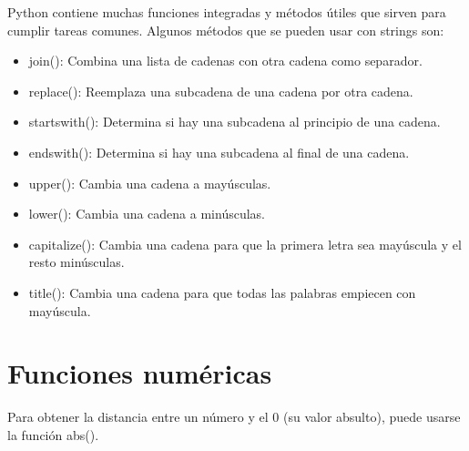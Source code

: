 \documentclass{report}
\begin{document}
Python contiene muchas funciones integradas y métodos útiles que sirven para cumplir tareas comunes. Algunos métodos que se pueden usar con strings son:

\begin{itemize}
  \item join(): Combina una lista de cadenas con otra cadena como separador.
  

  \item replace(): Reemplaza una subcadena de una cadena por otra cadena.


  \item startswith(): Determina si hay una subcadena al principio de una cadena.


  \item endswith(): Determina si hay una subcadena al final de una cadena.
  

  \item upper(): Cambia una cadena a mayúsculas.
  

  \item lower(): Cambia una cadena a minúsculas.
  

  \item capitalize(): Cambia una cadena para que la primera letra sea mayúscula y el resto minúsculas.

  
  \item title(): Cambia una cadena para que todas las palabras empiecen con mayúscula.
  

\end{itemize}

\section{Funciones numéricas}

Para obtener la distancia entre un número y el 0 (su valor absulto), puede usarse la función abs().
\end{document}
